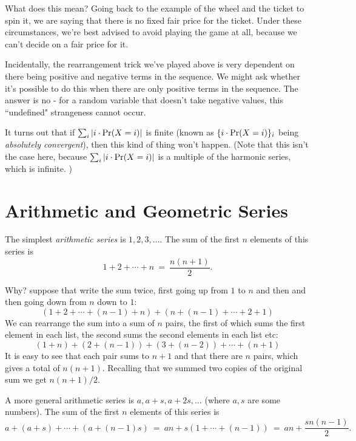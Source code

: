 What does this mean? 
Going back to the example of the wheel and the ticket to spin it, we are saying that there is no fixed fair price for the ticket. 
Under these circumstances, we're best advised to avoid playing the game at all, 
because we can't decide on a fair price for it.

Incidentally, the rearrangement trick we've played above is very dependent on there being positive and negative terms in the sequence. 
We might ask whether it's possible to do this when there are only positive terms in the sequence. 
The answer is no - for a random variable that doesn't take negative values, this ``undefined" strangeness cannot occur. 

It turns out that if $\sum_i |i \cdot \mbox{\rm Pr}(X = i)|$ is finite (known as $\{i \cdot \mbox{\rm Pr}(X = i) \}_i$ being \emph{absolutely convergent}), then this kind of thing won't happen. 
(Note that this isn't the case here, because $\sum_i \left| i \cdot \mbox{\rm Pr}(X = i) \right|$ is a multiple of the harmonic series, which is infinite. )




\section{Arithmetic and Geometric Series}

The simplest {\it arithmetic series} is $1,2,3,\ldots$. The sum of the first 
$n$ elements of this series is
$$ 1 + 2 + \cdots + n \ = \ \frac{n(n+1)}{2} .$$

Why? suppose that write the sum twice, first going up from $1$ to $n$
and then and then going down from $n$ down to $1$:
$$ \left(1 + 2 + \cdots + (n-1) + n\right) + 
\left(n + (n-1) + \cdots + 2 + 1\right) $$
We can rearrange the sum into a sum of $n$ pairs, the first of which
sums the first element in each list, the second sums the second
elements in each list etc:
$$ (1+n) + (2+(n-1)) + (3+(n-2)) + \cdots + (n+1) $$
It is easy to see that each pair sums to $n+1$ and that there are $n$
pairs, which gives a total of $n(n+1)$. Recalling that we summed two
copies of the original sum we get $n(n+1)/2$.

A more general arithmetic series is $a, a+s, a+2s, \ldots$
(where $a,s$ are some numbers). The sum of the first $n$ elements of this series is
$$ a + (a+s) + \cdots + (a + (n-1)s)
\ = \ 
an + s(1 + \cdots + (n-1))
\ = \ 
an + \frac{sn(n-1)}{2}.
$$
\\

